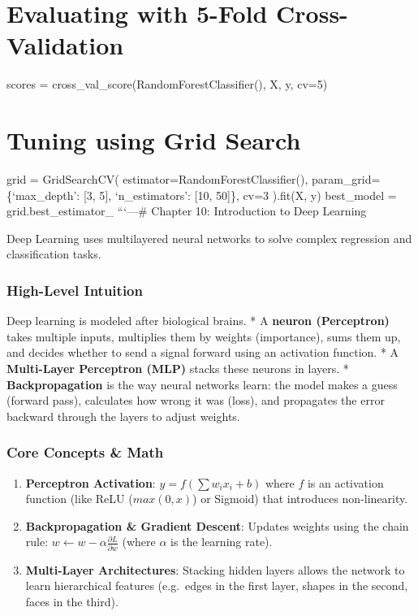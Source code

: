 \section{Evaluating with 5-Fold
Cross-Validation}\label{evaluating-with-5-fold-cross-validation}

scores = cross\_val\_score(RandomForestClassifier(), X, y, cv=5)

\section{Tuning using Grid Search}\label{tuning-using-grid-search}

grid = GridSearchCV( estimator=RandomForestClassifier(),
param\_grid=\{`max\_depth': {[}3, 5{]}, `n\_estimators': {[}10, 50{]}\},
cv=3 ).fit(X, y) best\_model = grid.best\_estimator\_ ```\n\n---\n\n\#
Chapter 10: Introduction to Deep Learning

Deep Learning uses multilayered neural networks to solve complex
regression and classification tasks.

\subsubsection{High-Level Intuition}\label{high-level-intuition-9}

Deep learning is modeled after biological brains. * A \textbf{neuron
(Perceptron)} takes multiple inputs, multiplies them by weights
(importance), sums them up, and decides whether to send a signal forward
using an activation function. * A \textbf{Multi-Layer Perceptron (MLP)}
stacks these neurons in layers. * \textbf{Backpropagation} is the way
neural networks learn: the model makes a guess (forward pass),
calculates how wrong it was (loss), and propagates the error backward
through the layers to adjust weights.

\subsubsection{Core Concepts \& Math}\label{core-concepts-math}

\begin{enumerate}
\def\labelenumi{\arabic{enumi}.}
\tightlist
\item
  \textbf{Perceptron Activation}: \(y = f(\sum w_i x_i + b)\) where
  \(f\) is an activation function (like ReLU (\(max(0,x)\)) or Sigmoid)
  that introduces non-linearity.
\item
  \textbf{Backpropagation \& Gradient Descent}: Updates weights using
  the chain rule:
  \(w \leftarrow w - \alpha \frac{\partial L}{\partial w}\) (where
  \(\alpha\) is the learning rate).
\item
  \textbf{Multi-Layer Architectures}: Stacking hidden layers allows the
  network to learn hierarchical features (e.g.~edges in the first layer,
  shapes in the second, faces in the third).
\end{enumerate}


